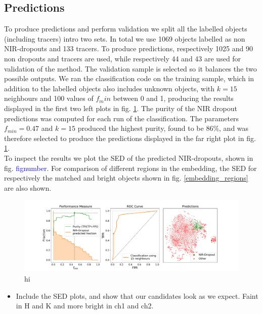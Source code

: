 \subsection{Predictions}
To produce predictions and perform validation we split all the labelled objects (including tracers) intro two sets. In total we use 1069 objects labelled as non NIR-dropouts and 133 tracers. To produce predictions, respectively 1025 and 90 non dropouts and tracers are used, while respectively 44 and 43 are used for validation of the method. The validation sample is selected so it balances the two possible outputs. We ran the classification code on the training sample, which in addition to the labelled objects also includes unknown objects, with $k=15$ neighbours and 100 values of $f_min$ between 0 and 1, producing the results displayed in the first two left plots in fig. \ref{classification_plot}. The purity of the NIR dropout predictions was computed for each run of the classification. The parameters $f_{min}=0.47$ and $k=15$ produced the highest purity, found to be 86\%, and was therefore selected to produce the predictions displayed in the far right plot in fig. \ref{classification_plot}. \\

To inspect the results we plot the SED of the predicted NIR-dropouts, shown in fig. \textcolor{blue}{fignumber}. For comparison of different regions in the embedding, the SED for respectively the matched and bright objects shown in fig. \ref{embedding_regions} are also shown.

\begin{figure}[]
    \centering %
    \includegraphics[trim={3.5cm 0cm 4.5cm 0cm},clip,width=\textwidth]{Code/Saved_Figures/Classification_plot.pdf}
    \caption{hi}
    \label{classification_plot}
\end{figure}




\begin{itemize}
    \item Include the SED plots, and show that our candidates look as we expect. Faint in H and K and more bright in ch1 and ch2.
\end{itemize}


